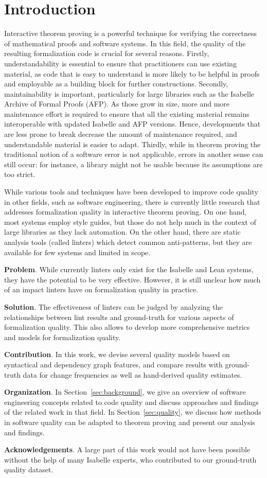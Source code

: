 \section{Introduction}
Interactive theorem proving is a powerful technique for verifying the correctness of mathematical proofs and software systems.
In this field, the quality of the resulting formalization code is crucial for several reasons.
Firstly, understandability is essential to ensure that practitioners can use existing material,
as code that is easy to understand is more likely to be helpful in proofs and employable as a building block for further constructions.
Secondly, maintainability is important, particularly for large libraries such as the Isabelle Archive of Formal Proofs (AFP).
As those grow in size, more and more maintenance effort is required to ensure that all the existing material remains interoperable with updated Isabelle and AFP versions.
Hence, developments that are less prone to break decrease the amount of maintenance required,
and understandable material is easier to adapt.
Thirdly, while in theorem proving the traditional notion of a software error is not applicable,
errors in another sense can still occur:
for instance, a library might not be usable because its assumptions are too strict.

While various tools and techniques have been developed to improve code quality in other fields,
such as software engineering,
there is currently little research that addresses formalization quality in interactive theorem proving.
On one hand, most systems employ style guides,
but those do not help much in the context of large libraries as they lack automation.
On the other hand, there are static analysis tools (called linters) which detect common anti-patterns,
but they are available for few systems and limited in scope.

\textbf{Problem}.
While currently linters only exist for the Isabelle and Lean systems,
they have the potential to be very effective.
However, it is still unclear how much of an impact linters have on formalization quality in practice.

\textbf{Solution}.
The effectiveness of linters can be judged by analyzing the relationships between lint results and ground-truth for various aspects of formalization quality.
This also allows to develop more comprehensive metrics and models for formalization quality.

\textbf{Contribution}.
In this work, we devise several quality models based on syntactical and dependency graph features,
and compare results with ground-truth data for change frequencies
as well as hand-derived quality estimates.

\textbf{Organization}.
In Section~\ref{sec:background},
we give an overview of software engineering concepts related to code quality
and discuss approaches and findings of the related work in that field.
In Section~\ref{sec:quality}, we discuss how methods in software quality can be adapted to theorem proving
and present our analysis and findings.

\textbf{Acknowledgements}.
A large part of this work would not have been possible without the help of many Isabelle experts,
who contributed to our ground-truth quality dataset.